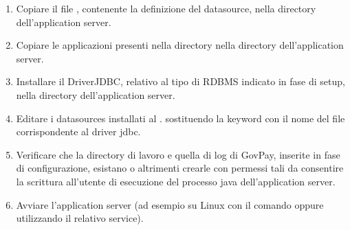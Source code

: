 \documentclass[letterpaper,10pt,italian]{sphinxmanual}
\begin{document}
\begin{enumerate}
\item {} 
Copiare il file , contenente la
definizione del datasource, nella directory
 dell’application server.

\item {} 
Copiare le applicazioni presenti nella directory  nella
directory  dell’application server.

\item {} 
Installare il DriverJDBC, relativo al tipo di RDBMS indicato in fase
di setup, nella directory  dell’application server.

\item {} 
Editare i datasources installati al . sostituendo la
keyword  con il nome del file corrispondente
al driver jdbc.

\item {} 
Verificare che la directory di lavoro e quella di log di GovPay,
inserite in fase di configurazione, esistano o altrimenti crearle con
permessi tali da consentire la scrittura all’utente di esecuzione del
processo java dell’application server.

\item {} 
Avviare l’application server (ad esempio su Linux con il comando
 oppure utilizzando il relativo
service).

\end{enumerate}
\end{document}
